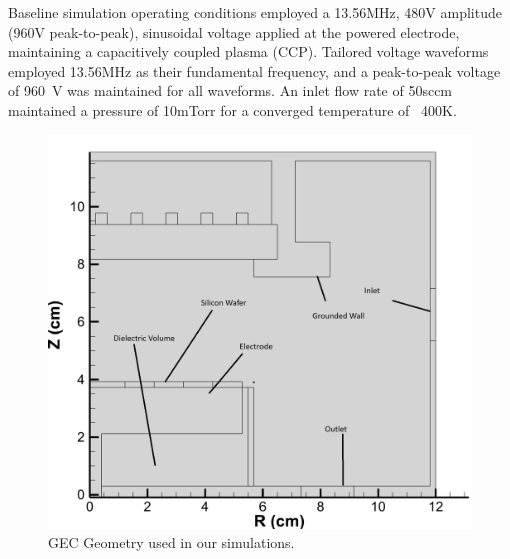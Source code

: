 \documentclass[12pt]{article}
\begin{document}
Baseline simulation operating conditions employed a 13.56MHz, 480V amplitude (960V peak-to-peak), sinusoidal voltage applied at the powered electrode, maintaining a capacitively coupled plasma (CCP). Tailored voltage waveforms employed 13.56MHz as their fundamental frequency, and a peak-to-peak voltage of 960~V was maintained for all waveforms. An inlet flow rate of 50sccm maintained a pressure of 10mTorr for a converged temperature of ~400K.



\begin{figure}[H]
    \centering
    \includegraphics[width=\linewidth]{Figures/Geometry.png}
    \caption{GEC Geometry used in our simulations.}
    \label{fig:GEC_geometry}
\end{figure}
\end{document}

